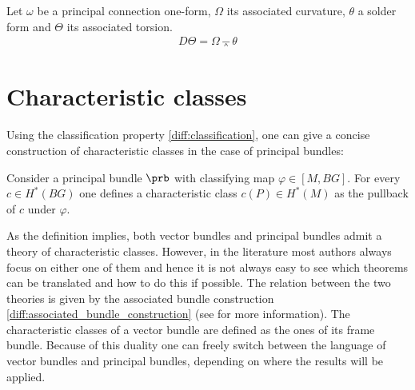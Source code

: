     \begin{property}
        Let $\omega$ be a principal connection one-form, $\Omega$ its associated curvature, $\theta$ a solder form and $\Theta$ its associated torsion.
        \begin{gather}
            D\Theta = \Omega\barwedge\theta
        \end{gather}
    \end{property}

\section{Characteristic classes}

    Using the classification property \ref{diff:classification}, one can give a concise construction of characteristic classes in the case of principal bundles:
    \begin{construct}
        Consider a principal bundle $\prb$ with classifying map $\varphi\in[M, BG]$. For every $c\in H^*(BG)$ one defines a characteristic class $c(P)\in H^*(M)$ as the pullback of $c$ under $\varphi$.
    \end{construct}

    As the definition implies, both vector bundles and principal bundles admit a theory of characteristic classes. However, in the literature most authors always focus on either one of them and hence it is not always easy to see which theorems can be translated and how to do this if possible. The relation between the two theories is given by the associated bundle construction \ref{diff:associated_bundle_construction} (see \cite{sorensen} for more information). The characteristic classes of a vector bundle are defined as the ones of its frame bundle. Because of this duality one can freely switch between the language of vector bundles and principal bundles, depending on where the results will be applied.

